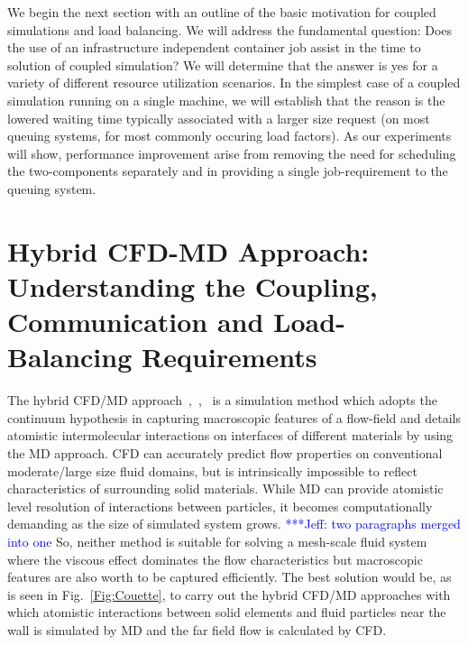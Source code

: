 \documentclass[conference,final]{IEEEtran}
\newcommand{\jhanote}[1]{ {\textcolor{red} { ***Jha: #1 }}}
\newcommand{\skonote}[1]{ {\textcolor{blue} { ***Jeff: #1 }}}
\newcommand{\jhanote}[1]{}
\newcommand{\skonote}[1]{}
\begin{document}
We begin the next section with an outline of the basic motivation for
coupled simulations and load balancing.  We will address the
fundamental question: Does the use of an infrastructure independent
container job assist in the time to solution of coupled simulation? We
will determine that the answer is yes for a variety of different
resource utilization scenarios. In the simplest case of a coupled
simulation running on a single machine, we will establish that the
reason is the lowered waiting time typically associated with a larger
size request (on most queuing systems, for most commonly occuring load
factors).  As our experiments will show, performance improvement arise
from removing the need for scheduling the two-components separately
and in providing a single job-requirement to the queuing system.


\section{Hybrid CFD-MD Approach: Understanding the Coupling,
  Communication and Load-Balancing Requirements}


The hybrid CFD/MD approach~\cite{Thompson},~\cite{Nie},~\cite{Yen} is
a simulation method which adopts the continuum hypothesis in capturing
macroscopic features of a flow-field and details atomistic
intermolecular interactions on interfaces of different materials by
using the MD approach. CFD can accurately predict flow properties on
conventional moderate/large size fluid domains, but is intrinsically
impossible to reflect characteristics of surrounding solid materials.
While MD can provide atomistic level resolution of interactions
between particles, it becomes computationally demanding as the size of simulated system grows. \skonote{two paragraphs merged into one} So, neither method is suitable for solving a mesh-scale fluid system where the viscous effect dominates the flow characteristics but macroscopic features are also worth to be captured efficiently. The best solution would be, as is seen in Fig.~\ref{Fig:Couette}, to
carry out the hybrid CFD/MD approaches with which atomistic
interactions between solid elements and fluid particles near the wall
is simulated by MD and the far field flow is calculated by CFD.
\end{document}
